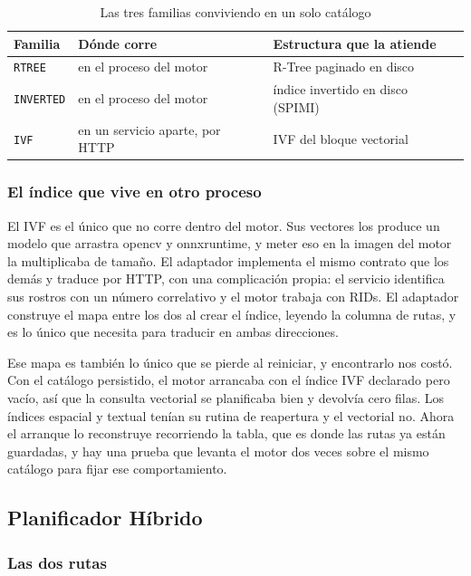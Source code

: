 \begin{table}[H]
\centering
\caption{Las tres familias conviviendo en un solo catálogo}
\begin{tabularx}{\textwidth}{@{}llX@{}}
\toprule
\textbf{Familia} & \textbf{Dónde corre} & \textbf{Estructura que la atiende} \\
\midrule
\texttt{RTREE} & en el proceso del motor & R-Tree paginado en disco \\
\texttt{INVERTED} & en el proceso del motor & índice invertido en disco (SPIMI) \\
\texttt{IVF} & en un servicio aparte, por HTTP & IVF del bloque vectorial \\
\bottomrule
\end{tabularx}
\end{table}

\subsubsection{El índice que vive en otro proceso}

El IVF es el único que no corre dentro del motor. Sus vectores los produce un
modelo que arrastra opencv y onnxruntime, y meter eso en la imagen del motor la
multiplicaba de tamaño. El adaptador implementa el mismo contrato que los demás
y traduce por HTTP, con una complicación propia: el servicio identifica sus
rostros con un número correlativo y el motor trabaja con RIDs. El adaptador
construye el mapa entre los dos al crear el índice, leyendo la columna de rutas,
y es lo único que necesita para traducir en ambas direcciones.

Ese mapa es también lo único que se pierde al reiniciar, y encontrarlo nos costó.
Con el catálogo persistido, el motor arrancaba con el índice IVF declarado pero
vacío, así que la consulta vectorial se planificaba bien y devolvía cero filas.
Los índices espacial y textual tenían su rutina de reapertura y el vectorial no.
Ahora el arranque lo reconstruye recorriendo la tabla, que es donde las rutas ya
están guardadas, y hay una prueba que levanta el motor dos veces sobre el mismo
catálogo para fijar ese comportamiento.

\subsection{Planificador Híbrido}

\subsubsection{Las dos rutas}

